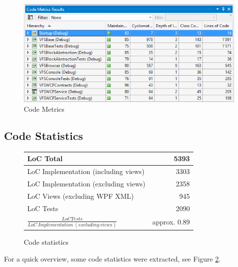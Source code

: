 \documentclass[JCDReport.tex]{subfiles}
\begin{document}
\begin{figure}[h!]
	\centering
	\includegraphics[scale=0.75]{Images/code_metrics.png} 
	\caption{Code Metrics}
	\label{fig:codeMetrics}
\end{figure}	

\subsection{Code Statistics}

\begin{figure}[h!]
	\centering
	\begin{tabular}{|l|r|}
	\hline 
	LoC Total & 5393 \\ 
	\hline 
	LoC Implementation (including views) & 3303 \\ 
	\hline 
	LoC Implementation (excluding views) & 2358 \\ 
	\hline 
	LoC Views (excluding WPF XML) & 945 \\ 
	\hline 
	LoC Tests & 2090 \\ 
	\hline 
	{\Large $\frac{LoC Tests}{LoC\ Implementation\ (excluding\ views)}$} & approx. 0.89 \\
	\hline 
	\end{tabular}
	\caption{Code statistics}
	\label{fig:codeStatisticsTable}
\end{figure}	

For a quick overview, some code statistics were extracted, see Figure \ref{fig:codeStatisticsTable}.
\end{document}
